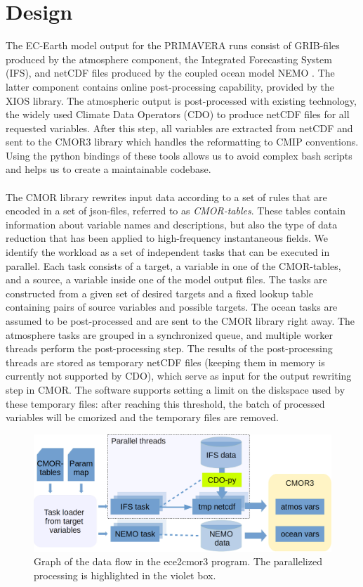 \documentclass[procedia]{easychair}
\begin{document}
\section{Design}
The EC-Earth model output for the PRIMAVERA runs consist of GRIB-files produced 
by the atmosphere component, the Integrated Forecasting System (IFS), and 
netCDF files produced by the coupled ocean model NEMO \cite{NEMO}. The latter 
component 
contains online post-processing capability, provided by the XIOS library. The 
atmospheric output is post-processed with existing technology, the widely used 
Climate Data Operators (CDO) \cite{CDO} to produce netCDF files for all 
requested 
variables. After this step, all variables are extracted from netCDF and sent to 
the CMOR3 library \cite{CMOR} which handles the reformatting to CMIP 
conventions. Using the 
python bindings of these tools allows us to avoid complex bash scripts and 
helps us to create a maintainable codebase.\\
\\
The CMOR library rewrites input data according to a set of rules that are 
encoded in a set of json-files, referred to as \emph{CMOR-tables}. These tables 
contain information about variable names and descriptions, but also the type of 
data reduction that has been applied to high-frequency instantaneous fields. We 
identify the workload as a set of independent tasks that can be executed in 
parallel. Each task consists of a target, a variable in one of the CMOR-tables, 
and a source, a variable inside one of the model output files. The tasks are 
constructed from a given set of desired targets and a fixed lookup table 
containing pairs of source variables and possible targets. The ocean tasks 
are assumed to be post-processed and are sent to the CMOR library right away. 
The atmosphere tasks are grouped in a synchronized queue, and multiple worker 
threads perform the post-processing step. The results of the post-processing 
threads are stored as temporary netCDF files (keeping them in memory is 
currently not supported by CDO), which serve as input for the output rewriting 
step in CMOR. The software supports setting a limit on the diskspace used by 
these temporary files: after reaching this threshold, the batch of processed 
variables will be cmorized and the temporary files are removed.\\
\begin{figure}[ht]
 \centering
 \includegraphics[width=\textwidth,clip]{ece2cmor3flowv3.png}
 \caption{Graph of the data flow in the ece2cmor3 program. The parallelized 
processing is highlighted in the violet box.}
\end{figure}
\end{document}
